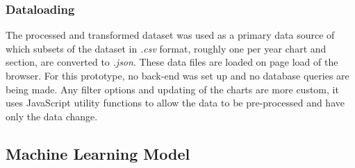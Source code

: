 \subsubsection{Dataloading}
The processed and transformed dataset was used as a primary data source of which subsets of the dataset in \textit{.csv} format, roughly one per year chart and section, are converted to \textit{.json}. These data files are loaded on page load of the browser. For this prototype, no back-end was set up and no database queries are being made. Any filter options and updating of the charts are more custom, it uses JavaScript utility functions to allow the data to be pre-processed and have only the data change. 

\subsection{Machine Learning Model}
